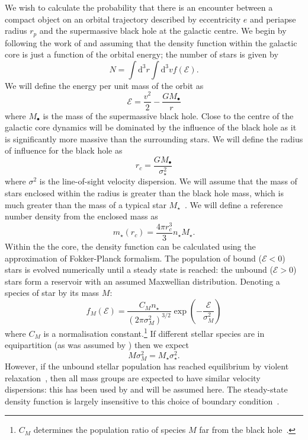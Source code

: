 \documentclass[useAMS,usedcolumn,usegraphicx,usenatbib]{mn2e}
\newcommand{\dd}{\ensuremath{\mathrm{d}}}
\begin{document}
We wish to calculate the probability that there is an encounter between a compact object on an orbital trajectory described by eccentricity $e$ and periapse radius $r_p$ and the supermassive black hole at the galactic centre. We begin by following the work of \citet{Bahcall1976, Bahcall1977} and assuming that the density function within the galactic core is just a function of the orbital energy; the number of stars is given by
\begin{equation}
N = \int \dd^3r \int \dd^3v f(\mathcal{E}).
\end{equation}
We will define the energy per unit mass of the orbit as
\begin{equation}
\mathcal{E} = \frac{v^2}{2} - \frac{GM_\bullet}{r}
\end{equation}
where $M_\bullet$ is the mass of the supermassive black hole. Close to the centre of the galactic core dynamics will be dominated by the influence of the black hole as it is significantly more massive than the surrounding stars. We will define the radius of influence for the black hole as
\begin{equation}
r_c = \frac{GM_\bullet}{\sigma_\star^2}
\end{equation}
where $\sigma^2$ is the line-of-sight velocity dispersion. We will assume that the mass of stars enclosed within the radius is greater than the black hole mass, which is much greater than the mass of a typical star $M_\star$~\citep{Bahcall1976}. We will define a reference number density from the enclosed mass as
\begin{equation}
m_\star(r_c) = \frac{4\pi r_c^3}{3}n_\star M_\star.
\end{equation}
Within the the core, the density function can be calculated using the approximation of Fokker-Planck formalism. The population of bound ($\mathcal{E} < 0$) stars is evolved numerically until a steady state is reached: the unbound ($\mathcal{E} > 0$) stars form a reservoir with an assumed Maxwellian distribution. Denoting a species of star by its mass $M$:
\begin{equation}
f_M(\mathcal{E}) = \frac{C_M n_\star}{(2\pi\sigma_M^2)^{3/2}} \exp\left(-\frac{\mathcal{E}}{\sigma_M^2}\right)
\end{equation}
where $C_M$ is a normalisation constant.\footnote{$C_M$ determines the population ratio of species $M$ far from the black hole~\cite{Alexander2009}.} If different stellar species are in equipartition (as was assumed by \citet{Bahcall1976, Bahcall1977}) then we expect
\begin{equation}
M \sigma_M^2 = M_\star \sigma_\star^2.
\end{equation}
However, if the unbound stellar population has reached equilibrium by violent relaxation~\citep{Lynden-Bell1967}, then all mass groups are expected to have similar velocity dispersions: this has been used by \citet{Alexander2009, O'Leary2009} and will be assumed here. The steady-state density function is largely insensitive to this choice of boundary condition~\citep{Bahcall1977, Alexander2009}.
\end{document}

